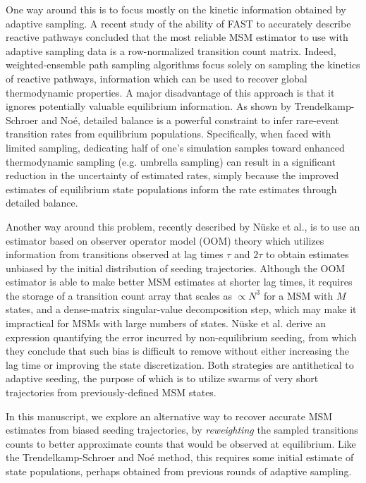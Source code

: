 \documentclass[%
 aip,
rsi,%
 amsmath,amssymb,
 reprint,%
]{revtex4-1}
\begin{document}
One way around this is to focus mostly on the kinetic information obtained by adaptive sampling.  A recent study of the ability of FAST to accurately describe reactive pathways concluded that the most reliable MSM estimator to use with adaptive sampling data is a row-normalized transition count matrix.\cite{Zimmerman:2018jn} Indeed, weighted-ensemble path sampling algorithms focus solely on sampling the kinetics of reactive pathways, information which can be used to recover global thermodynamic properties.\cite{BinWZhang:2010kf,Zwier:2015fn, Dickson:2016it, Lotz:2018hx, Dixon:2018fs} A major disadvantage of this approach is that it ignores potentially valuable equilibrium information.  As shown by Trendelkamp-Schroer and No{\'e},\cite{trendelkamp2016efficient} detailed balance is a powerful constraint to infer rare-event transition rates from equilibrium populations.  Specifically, when faced with limited sampling, dedicating half of one's simulation samples toward enhanced thermodynamic sampling (e.g. umbrella sampling) can result in a significant reduction in the uncertainty of estimated rates, simply because the improved estimates of equilibrium state populations inform the rate estimates through detailed balance.

Another way around this problem, recently described by N{\"u}ske et al., is to use an estimator based on observer operator model (OOM) theory which utilizes information from transitions observed at lag times $\tau$ and $2\tau$ to obtain estimates unbiased by the initial distribution of seeding trajectories.\cite{Nuske:2017ex}  Although the OOM estimator is able to make better MSM estimates at shorter lag times, it requires the storage of a transition count array that scales as $\propto N^3$ for a MSM with $M$ states, and a dense-matrix singular-value decomposition step, which may make it impractical for MSMs with large numbers of states.  N{\"u}ske et al. derive an expression quantifying the error incurred by non-equilibrium seeding, from which they conclude that such bias is difficult to remove without either increasing the lag time or improving the state discretization.  Both strategies are antithetical to adaptive seeding, the purpose of which is to utilize swarms of very short trajectories from previously-defined MSM states. 

In this manuscript, we explore an alternative way to recover accurate MSM estimates from biased seeding trajectories, by \textit{reweighting} the sampled transitions counts to better approximate counts that would be observed at equilibrium.  Like the Trendelkamp-Schroer and No{\'e} method, this requires some initial estimate of state populations, perhaps obtained from previous rounds of adaptive sampling.
\end{document}
